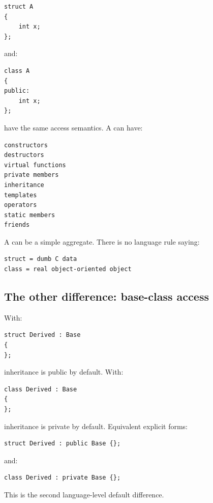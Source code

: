 \begin{verbatim}
struct A
{
    int x;
};
\end{verbatim}

and:

\begin{verbatim}
class A
{
public:
    int x;
};
\end{verbatim}

have the same access semantics. A  can have:

\begin{verbatim}
constructors
destructors
virtual functions
private members
inheritance
templates
operators
static members
friends
\end{verbatim}

A  can be a simple aggregate. There is no language rule saying:

\begin{verbatim}
struct = dumb C data
class = real object-oriented object
\end{verbatim}

\subsection{The other difference: base-class access}\label{05-engine-i-ch003-the-other-difference-base-class-access}

\hypertarget{05-engine-i-ch003-the-other-difference-base-class-access}{}

With:

\begin{verbatim}
struct Derived : Base
{
};
\end{verbatim}

inheritance is public by default. With:

\begin{verbatim}
class Derived : Base
{
};
\end{verbatim}

inheritance is private by default. Equivalent explicit forms:

\begin{verbatim}
struct Derived : public Base {};
\end{verbatim}

and:

\begin{verbatim}
class Derived : private Base {};
\end{verbatim}

This is the second language-level default difference.

